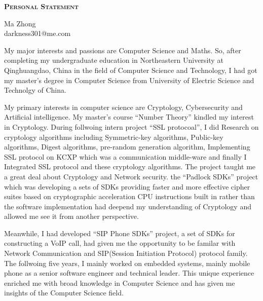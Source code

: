 \documentclass[letterpaper]{article}
\makeatletter
\newcommand{\pstitle}{Personal Statement}
\newcommand{\yourname}{Ma Zhong}
\newcommand{\youremail}{darkness301@me.com}
\newcommand{\amper}{{\fontspec[Scale=.95]{Helvetica}\selectfont\itshape\&~{}}}
\makeatother
\begin{document}
\begin{center}{\huge \scshape \bfseries \pstitle}\end{center}
\begin{center}\vspace{0.2em} {\Large \yourname\\}
	{\youremail}\end{center}

My major interests and passions are Computer Science and Maths. So,
after completing my undergraduate education in Northeastern University
at Qinghuangdao, China in the field of Computer Science and Technology,
I had got my master's degree in Computer Science from University of Electric
Science and Technolgy of China.\vspace{4pt}

My primary interests in computer science are Cryptology, Cybersecurity and 
Artificial intelligence. My master's course ``Number Theory'' kindled my 
interest in Cryptology. During follwoing intern project ``SSL protocoal'', I did 
Research on cryptology algorithms including Symmetric-key algorithms, Public-key 
algorithms, Digest algorithms, pre-random generation algorithm, Implementing 
SSL protocol on KCXP which was a communication middle-ware and finally I 
Integrated SSL protocol and these cryptology algorithms. The project taught me a 
great deal about Cryptology and Network security. the ``Padlock SDKs'' project 
which was developing a sets of SDKs providing faster and more effective cipher 
suites based on cryptographic acceleration CPU instructions built in rather than 
the software implementation had deepend my understanding of Cryptology and 
allowed me see it from another perspective.\vspace{4pt}

Meanwhile, I had developed ``SIP Phone SDKs'' project, a set of SDKs for 
constructing a VoIP call, had given me the opportunity to be familar with 
Network Communication and SIP(Session Initiation Protocol) protocol family. 
The follwoing five years, I mainly worked on embedded systems, mainly mobile 
phone as a senior software engineer and technical leader. This unique experience 
enriched me with broad knowledge in Computer Science and has given me insights of 
the Computer Science field.\vspace{4pt}
\end{document}
